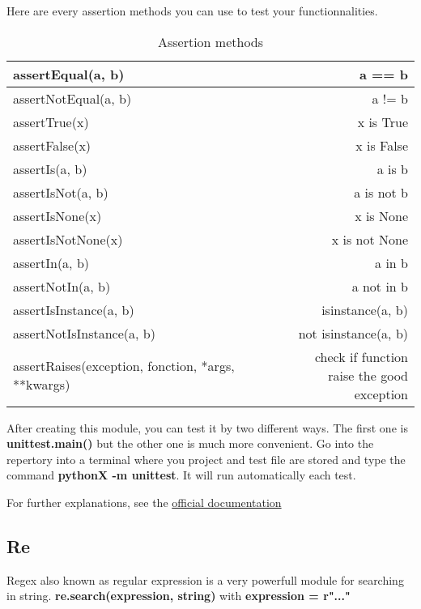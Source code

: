 \documentclass[a4paper, 12pt, titlepage]{scrartcl} %
\begin{document}
Here are every assertion methods you can use to test your functionnalities.
\begin{table}[h]
\begin{center}
{\renewcommand{\arraystretch}{1} %
{\setlength{\tabcolsep}{0.5cm} %
\begin{tabular}{|l|r|}
  \hline
  assertEqual(a, b) & a == b \\
  \hline
  assertNotEqual(a, b) & a != b \\
  \hline
  assertTrue(x) & x is True \\
  \hline
  assertFalse(x) & x is False \\
  \hline
  assertIs(a, b) & a is b \\
  \hline
  assertIsNot(a, b) & a is not b \\
  \hline
  assertIsNone(x) & x is None \\
  \hline
  assertIsNotNone(x) & x is not None \\
  \hline
  assertIn(a, b) & a in b \\
  \hline
  assertNotIn(a, b) & a not in b \\
  \hline
  assertIsInstance(a, b) & isinstance(a, b) \\
  \hline
  assertNotIsInstance(a, b) & not isinstance(a, b) \\
  \hline
  assertRaises(exception, fonction, *args, **kwargs) & \makecell{check if function \\ raise the good exception}  \\
  \hline
\end{tabular}}}
\end{center}
\caption{Assertion methods}
\end{table}

After creating this module, you can test it by two different ways. The first one is \textbf{unittest.main()} but the other one is much more convenient. Go into the repertory into a terminal where you project and test file are stored and type the command \textbf{pythonX -m unittest}. It will run automatically each test.

For further explanations, see the \href{https://docs.python.org/3/library/unittest.html}{official documentation}


\subsection{Re}
Regex also known as regular expression is a very powerfull module for searching in string. \textbf{re.search(expression, string)} with \textbf{expression = r"..."} \\
\end{document}
